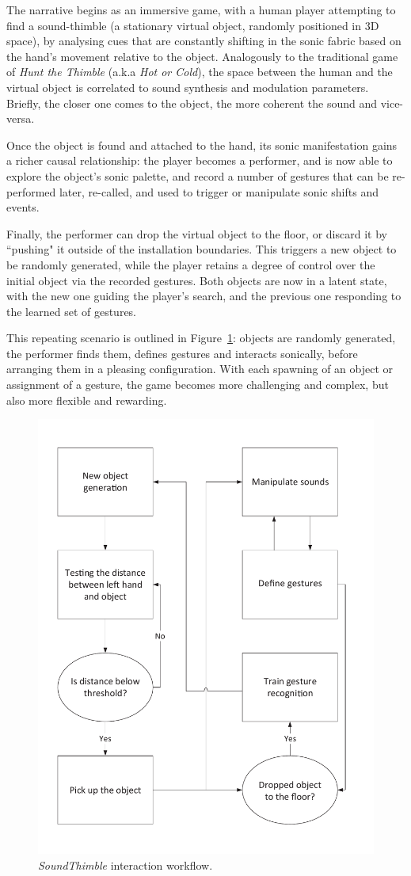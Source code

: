 The narrative begins as an immersive game, with a human player attempting to find a sound-thimble (a stationary virtual object, randomly positioned in 3D space), by analysing cues that are constantly shifting in the sonic fabric based on the hand's movement relative to the object. Analogously to the traditional game of \textit{Hunt the Thimble} (a.k.a \textit{Hot or Cold}), the space between the human and the virtual object is correlated to sound synthesis and modulation parameters. Briefly, the closer one comes to the object, the more coherent the sound and vice-versa. 

Once the object is found and attached to the hand, its sonic manifestation gains a richer causal relationship: the player becomes a performer, and is now able to explore the object's sonic palette, and record a number of gestures that can be re-performed later, re-called, and used to trigger or manipulate sonic shifts and events.

Finally, the performer can drop the virtual object to the floor, or discard it by ``pushing" it outside of the installation boundaries. This triggers a new object to be randomly generated, while the player retains a degree of control over the initial object via the recorded gestures. Both objects are now in a latent state, with the new one guiding the player's search, and the previous one responding to the learned set of gestures.

This repeating scenario is outlined in Figure~\ref{fig:concept}: objects are randomly generated, the performer finds them, defines gestures and interacts sonically, before arranging them in a pleasing configuration. With each spawning of an object or assignment of a gesture, the game becomes more challenging and complex, but also more flexible and rewarding.


\begin{figure}[t]
	\centering
	\includegraphics[width=.65\columnwidth, clip, trim={0 .55cm 0 0}]{img/concept}
	\caption{\textit{SoundThimble} interaction workflow.}
	\label{fig:concept}
\end{figure}

